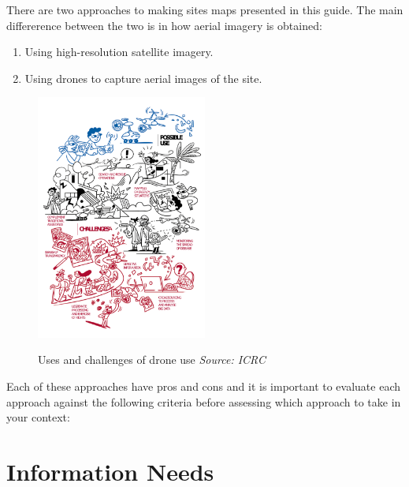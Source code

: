 \documentclass[
  a4paper,
  onecolumn,
  oneside]{book}
\providecommand{\tightlist}{%
  \setlength{\itemsep}{0pt}\setlength{\parskip}{0pt}}\usepackage{longtable,booktabs,array}
\begin{document}
There are two approaches to making sites maps presented in this guide.
The main differerence between the two is in how aerial imagery is
obtained:

\begin{enumerate}
\def\labelenumi{\arabic{enumi}.}
\tightlist
\item
  Using high-resolution satellite imagery.
\item
  Using drones to capture aerial images of the site.
\end{enumerate}

\begin{figure}

{\centering 

\href{images/droneuseschallenges.png}{\includegraphics[width=0.5\textwidth,height=\textheight]{part1/images/droneuseschallenges.png}}

}

\caption{\label{fig-droneuseschallenges}Uses and challenges of drone use
\emph{Source: ICRC}}

\end{figure}

Each of these approaches have pros and cons and it is important to
evaluate each approach against the following criteria before assessing
which approach to take in your context:\\

\hypertarget{information-needs}{%
\section{Information Needs}\label{information-needs}}
\end{document}

